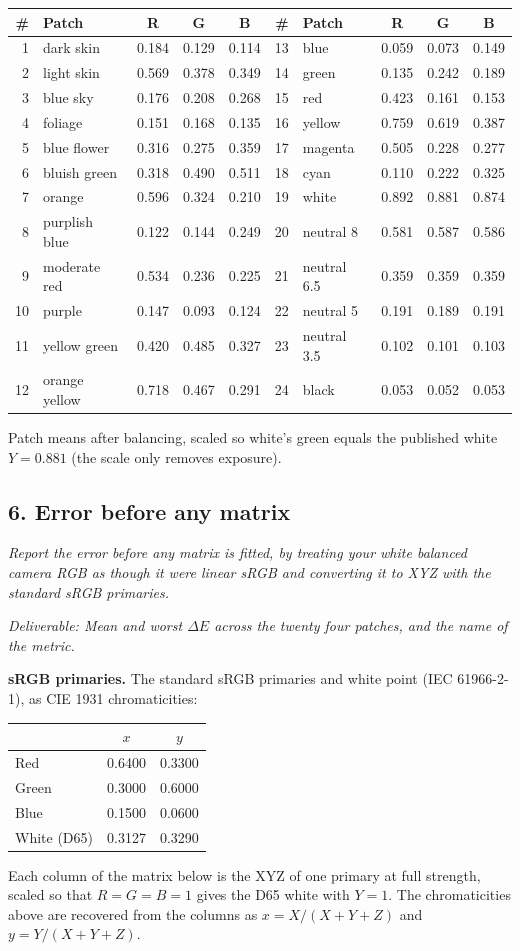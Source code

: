 \documentclass[11pt]{article}
\newcommand{\task}[3]{\subsection*{#1}{\sloppy\noindent\textit{#2}\par}\smallskip\noindent\textit{Deliverable: #3}\par\medskip}
\begin{document}
\begin{center}
\small
\begin{tabular}{rlccc@{\hspace{2em}}rlccc}
\toprule
\# & Patch & R & G & B & \# & Patch & R & G & B \\
\midrule
1 & dark skin & 0.184 & 0.129 & 0.114 & 13 & blue & 0.059 & 0.073 & 0.149 \\
2 & light skin & 0.569 & 0.378 & 0.349 & 14 & green & 0.135 & 0.242 & 0.189 \\
3 & blue sky & 0.176 & 0.208 & 0.268 & 15 & red & 0.423 & 0.161 & 0.153 \\
4 & foliage & 0.151 & 0.168 & 0.135 & 16 & yellow & 0.759 & 0.619 & 0.387 \\
5 & blue flower & 0.316 & 0.275 & 0.359 & 17 & magenta & 0.505 & 0.228 & 0.277 \\
6 & bluish green & 0.318 & 0.490 & 0.511 & 18 & cyan & 0.110 & 0.222 & 0.325 \\
7 & orange & 0.596 & 0.324 & 0.210 & 19 & white & 0.892 & 0.881 & 0.874 \\
8 & purplish blue & 0.122 & 0.144 & 0.249 & 20 & neutral 8 & 0.581 & 0.587 & 0.586 \\
9 & moderate red & 0.534 & 0.236 & 0.225 & 21 & neutral 6.5 & 0.359 & 0.359 & 0.359 \\
10 & purple & 0.147 & 0.093 & 0.124 & 22 & neutral 5 & 0.191 & 0.189 & 0.191 \\
11 & yellow green & 0.420 & 0.485 & 0.327 & 23 & neutral 3.5 & 0.102 & 0.101 & 0.103 \\
12 & orange yellow & 0.718 & 0.467 & 0.291 & 24 & black & 0.053 & 0.052 & 0.053 \\
\bottomrule
\end{tabular}
\end{center}
\noindent Patch means after balancing, scaled so white's green equals the published white $Y = 0.881$ (the scale only removes exposure).

\task{6. Error before any matrix}
{Report the error before any matrix is fitted, by treating your white balanced camera RGB as though it were linear sRGB and converting it to XYZ with the standard sRGB primaries.}
{Mean and worst $\Delta E$ across the twenty four patches, and the name of the metric.}

\noindent\textbf{sRGB primaries.} The standard sRGB primaries and white point (IEC 61966-2-1), as CIE 1931 chromaticities:
\begin{center}
\begin{tabular}{lcc}
\toprule
 & $x$ & $y$ \\
\midrule
Red & 0.6400 & 0.3300 \\
Green & 0.3000 & 0.6000 \\
Blue & 0.1500 & 0.0600 \\
White (D65) & 0.3127 & 0.3290 \\
\bottomrule
\end{tabular}
\end{center}
Each column of the matrix below is the XYZ of one primary at full strength, scaled so that $R = G = B = 1$ gives the D65 white with $Y = 1$. The chromaticities above are recovered from the columns as $x = X/(X+Y+Z)$ and $y = Y/(X+Y+Z)$.
\end{document}
